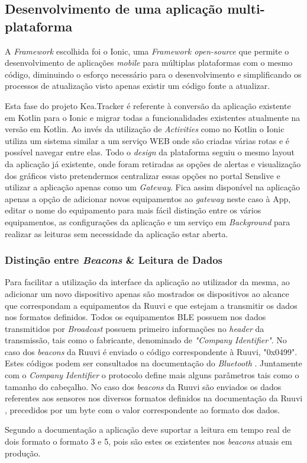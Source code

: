 \subsection{Desenvolvimento de uma aplicação multi-plataforma}

\par A \textit{Framework} escolhida foi o Ionic, uma \textit{Framework open-source} que permite o desenvolvimento de aplicações \textit{mobile} para múltiplas plataformas com o mesmo código, diminuindo o esforço necessário para o desenvolvimento e simplificando os processos de atualização visto apenas existir um código fonte a atualizar. 

\par Esta fase do projeto Kea.Tracker é referente à conversão da aplicação existente em Kotlin para o Ionic e migrar todas a funcionalidades existentes atualmente na versão em Kotlin. 
Ao invés da utilização de \textit{Activities} como no Kotlin o Ionic utiliza um sistema similar a um serviço WEB onde são criadas várias rotas e é possível navegar entre elas. Todo o \textit{design} da plataforma seguiu o mesmo layout da aplicação já existente, onde foram retiradas as opções de alertas e visualização dos gráficos visto pretendermos centralizar essas opções no portal Senslive e utilizar a aplicação apenas como um \textit{Gateway}. Fica assim disponível na aplicação apenas a opção de adicionar novos equipamentos ao \textit{gateway} neste caso à App, editar o nome do equipamento para mais fácil distinção entre os vários equipamentos, as configurações da aplicação e um serviço em \textit{Background} para realizar as leituras sem necessidade da aplicação estar aberta.
	
\subsubsection{Distinção entre \textit{Beacons} \& Leitura de Dados  }

\par Para facilitar a utilização da interface da aplicação ao utilizador da mesma, ao adicionar um novo dispositivo apenas são mostrados os dispositivos ao alcance que correspondam a equipamentos da Ruuvi e que estejam a transmitir os dados nos formatos definidos. Todos os equipamentos BLE possuem nos dados transmitidos por \textit{Broadcast} possuem primeiro informações no \textit{header} da transmissão, tais como o fabricante, denominado de \textit{"Company Identifier"}. No caso dos \textit{beacons} da Ruuvi é enviado o código  correspondente à Ruuvi, "0x0499". Estes códigos podem ser consultados na documentação do \textit{Bluetooth} \cite{companySI}. Juntamente com o \textit{Company Identifier} o protocolo define mais alguns parâmetros tais como o tamanho do cabeçalho. No caso dos \textit{beacons} da Ruuvi são enviados os dados referentes aos sensores nos diversos formatos definidos na documentação da Ruuvi \cite{GitHubRuuvi}, precedidos por um byte com o valor correspondente  ao formato dos dados.
\par Segundo a documentação a aplicação deve suportar a leitura em tempo real de dois formato o formato 3 e 5, pois são estes os existentes nos \textit{beacons} atuais em produção.



